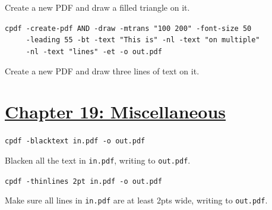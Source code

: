 \documentclass{book}
\begin{document}
\noindent Create a new PDF and draw a filled triangle on it.

\begin{framed}
 \noindent\small\verb?cpdf -create-pdf AND -draw -mtrans "100 200" -font-size 50?\\
 \noindent\small\verb?     -leading 55 -bt -text "This is" -nl -text "on multiple"?\\
 \noindent\small\verb?     -nl -text "lines" -et -o out.pdf?
\end{framed}

\noindent Create a new PDF and draw three lines of text on it.

\section*{\hyperref[chap:misc]{Chapter 19: Miscellaneous}}

\begin{framed}\noindent\texttt{cpdf -blacktext in.pdf -o out.pdf}\end{framed}

\noindent Blacken all the text in \texttt{in.pdf}, writing to \texttt{out.pdf}.

\begin{framed}\noindent\texttt{cpdf -thinlines 2pt in.pdf -o out.pdf}\end{framed}

\noindent Make sure all lines in \texttt{in.pdf} are at least 2pts wide, writing to \texttt{out.pdf}.
\pagestyle{empty}
\cleardoublepage
\end{document}

